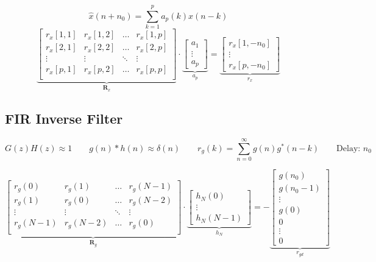 		$$\hat{x}(n+n_0) = \sum\limits_{k=1}^p a_p(k) x(n-k)$$
		$$
		\underbrace{\begin{bmatrix}
    		r_x[1,1] & r_x[1,2] & \hdots & r_x[1,p] \\                                   
    		r_x[2,1] & r_x[2,2] & \hdots & r_x[2,p] \\
    		\vdots & \vdots & \ddots & \vdots \\                             
    		r_x[p,1] & r_x[p,2] & \hdots & r_x[p,p] \\                        
		\end{bmatrix}  }_{\bm R_x} \cdot 
		\underbrace{\begin{bmatrix}
    		a_1 \\
    		\vdots \\
    		a_p
		\end{bmatrix}  }_{a_p}= \underbrace{\begin{bmatrix}
    		r_x[1,-n_0] \\
    		\vdots \\
    		r_x[p,-n_0]
		\end{bmatrix}  }_{r_x}$$

\subsection{FIR Inverse Filter }
$$G(z)H(z) \approx 1\qquad g(n)*h(n) \approx \delta(n) \qquad r_g(k) = \sum\limits_{n=0}^\infty g(n)g^*(n-k) \qquad \text{Delay: } n_0$$

		$$
		\underbrace{\begin{bmatrix}
    		r_g(0) & r_g(1) & \hdots & r_g(N-1) \\                                   
    		r_g(1) & r_g(0) & \hdots & r_g(N-2) \\
    		\vdots & \vdots & \ddots & \vdots \\                             
    		r_g(N-1) & r_g(N-2) & \hdots & r_g(0) \\                        
		\end{bmatrix}  }_{\bm R_g} \cdot 
		\underbrace{\begin{bmatrix}
    		h_N(0) \\
    		\vdots \\
    		h_N(N-1)
		\end{bmatrix}  }_{h_N}= -\underbrace{\begin{bmatrix}
    		g(n_0) \\
    		g(n_0 - 1)	 \\
    		\vdots \\
    		g(0)\\
    		0\\
    		\vdots \\
    		0
		\end{bmatrix}  }_{r_{gd}}$$



